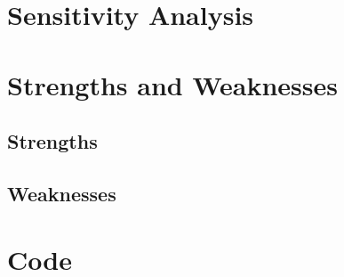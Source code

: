 \documentclass[12pt]{article}
\begin{document}
\section{Sensitivity Analysis}

\section{Strengths and Weaknesses}
\subsection{Strengths}
\subsection{Weaknesses}




\appendix
\section{Code}
\end{document}
